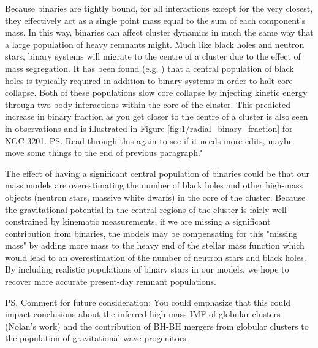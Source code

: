 Because binaries are tightly bound, for all interactions except for the very closest, they
effectively act as a single point mass equal to the sum of each component's mass. In this way,
binaries can affect cluster dynamics in much the same way that a large population of heavy remnants
might. Much like black holes and neutron stars, binary systems will migrate to the centre of a
cluster due to the effect of mass segregation. It has been found (e.g. \citealt{Kremer2019}) that a
central population of black holes is typically required in addition to binary systems in order to
halt core collapse. Both of these populations slow core collapse by injecting kinetic energy through
two-body interactions within the core of the cluster. This predicted increase in binary fraction as
you get closer to the centre of a cluster is also seen in observations and is illustrated in Figure
\ref{fig:1/radial_binary_fraction} for NGC 3201. \ps{Read through this again to see if it needs more
	edits, maybe move some things to the end of previous paragraph?}

The effect of having a significant central population of binaries could be that our mass models are
overestimating the number of black holes and other high-mass objects (neutron stars, massive white
dwarfs) in the core of the cluster. Because the gravitational potential in the central regions of
the cluster is fairly well constrained by kinematic measurements, if we are missing a significant
contribution from binaries, the models may be compensating for this "missing mass" by adding more
mass to the heavy end of the stellar mass function which would lead to an overestimation of the
number of neutron stars and black holes. By including realistic populations of binary stars in our
models, we hope to recover more accurate present-day remnant populations.

\ps{Comment for future consideration: You could emphasize that this could impact conclusions about
	the inferred high-mass IMF of globular clusters (Nolan's work) and the contribution of BH-BH
	mergers from globular clusters to the population of gravitational wave progenitors.}


